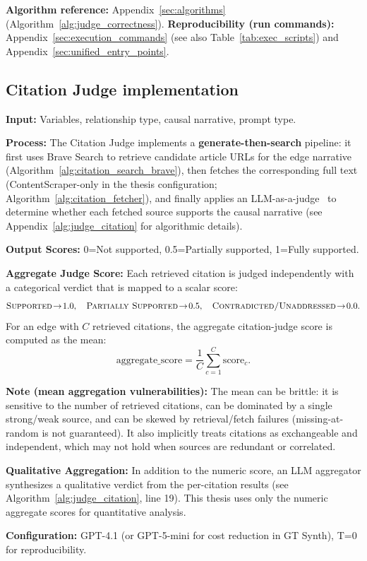\textbf{Algorithm reference:} Appendix~\ref{sec:algorithms} (Algorithm~\ref{alg:judge_correctness}). \textbf{Reproducibility (run commands):} Appendix~\ref{sec:execution_commands} (see also Table~\ref{tab:exec_scripts}) and Appendix~\ref{sec:unified_entry_points}.
\subsection{Citation Judge implementation}
\label{sec:citation_judge}
\textbf{Input:} Variables, relationship type, causal narrative, prompt type.

\textbf{Process:} The Citation Judge implements a \textbf{generate-then-search} pipeline: it first uses Brave Search to retrieve candidate article URLs for the edge narrative (Algorithm~\ref{alg:citation_search_brave}), then fetches the corresponding full text (ContentScraper-only in the thesis configuration; Algorithm~\ref{alg:citation_fetcher}), and finally applies an LLM-as-a-judge~\cite{zheng2024llmasajudge} to determine whether each fetched source supports the causal narrative (see Appendix~\ref{alg:judge_citation} for algorithmic details).

\textbf{Output Scores:} 0=Not supported, 0.5=Partially supported, 1=Fully supported.

\textbf{Aggregate Judge Score:} Each retrieved citation is judged independently with a categorical verdict that is mapped to a scalar score:
\[
\textsc{Supported}\!\to\!1.0,\quad
\textsc{Partially Supported}\!\to\!0.5,\quad
\textsc{Contradicted/Unaddressed}\!\to\!0.0.
\]
For an edge with \(C\) retrieved citations, the aggregate citation-judge score is computed as the mean:
\[
\text{aggregate\_score}=\frac{1}{C}\sum_{c=1}^{C}\text{score}_c.
\]

\noindent\textbf{Note (mean aggregation vulnerabilities):} The mean can be brittle: it is sensitive to the number of retrieved citations, can be dominated by a single strong/weak source, and can be skewed by retrieval/fetch failures (missing-at-random is not guaranteed). It also implicitly treats citations as exchangeable and independent, which may not hold when sources are redundant or correlated.

\noindent\textbf{Qualitative Aggregation:} In addition to the numeric score, an LLM aggregator synthesizes a qualitative verdict from the per-citation results (see Algorithm~\ref{alg:judge_citation}, line 19). This thesis uses only the numeric aggregate scores for quantitative analysis.

\textbf{Configuration:} GPT-4.1 (or GPT-5-mini for cost reduction in GT Synth), T=0 for reproducibility.

